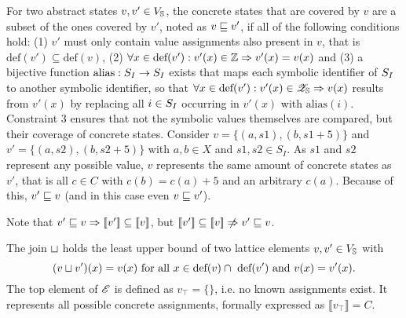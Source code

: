 For two abstract states $v, v' \in V_{\mathbb{S}}$, the concrete states that are covered by $v$ are a subset of the ones covered by $v'$, noted as $v \sqsubseteq v'$, if all of the following conditions hold:
(1) $v'$ must only contain value assignments also present in $v$, that is $\text{def}(v') \subseteq \text{def}(v)$,
(2) $\forall x \in \text{def}(v'): v'(x) \in \mathbb{Z} \Rightarrow v'(x) = v(x)$ and
(3) a bijective function $\text{alias}:S_I \rightarrow S_I$ exists
that maps each symbolic identifier of $S_I$ to another symbolic identifier,
so that $\forall x \in \text{def}(v'): v'(x) \in \mathscr{Z}_{\mathbb{S}} \Rightarrow v(x)$ results from $v'(x)$ by replacing all $i \in S_I$ occurring in $v'(x)$ with $\text{alias}(i)$.
Constraint 3 ensures that not the symbolic values themselves are compared, but their coverage of concrete states.
Consider $v = \{ (a, s1), (b, s1 + 5) \}$ and $v' = \{ (a, s2), (b, s2 + 5) \}$ with $a, b \in X$ and $s1, s2 \in S_I$. As $s1$ and $s2$ represent any possible value, $v$ represents the same amount of concrete states as $v'$, that is all $c \in C$ with $c(b) = c(a) + 5$ and an arbitrary $c(a)$. Because of this, $v' \sqsubseteq v$ (and in this case even $v \sqsubseteq v'$).

Note that $v' \sqsubseteq v \Rightarrow [\![ v' ]\!] \subseteq [\![ v ]\!]$,
but $\llbracket v' \rrbracket \subseteq \llbracket v \rrbracket \centernot\Rightarrow v' \lesserEqual v$.

The join $\sqcup$ holds the least upper bound of two lattice elements $v, v' \in V_{\mathbb{S}}$ with
  \[ (v \sqcup v')(x) = v(x) \text{ for all } x \in \text{def}(v) \cap\ \text{def}(v') \text{ and } v(x) = v'(x) \text{.} \]
The top element of $\mathscr{E}$ is defined as $v_\top = \{\}$, i.e. no known assignments exist. It represents all possible concrete assignments, formally expressed as $\llbracket v_\top \rrbracket = C$.

